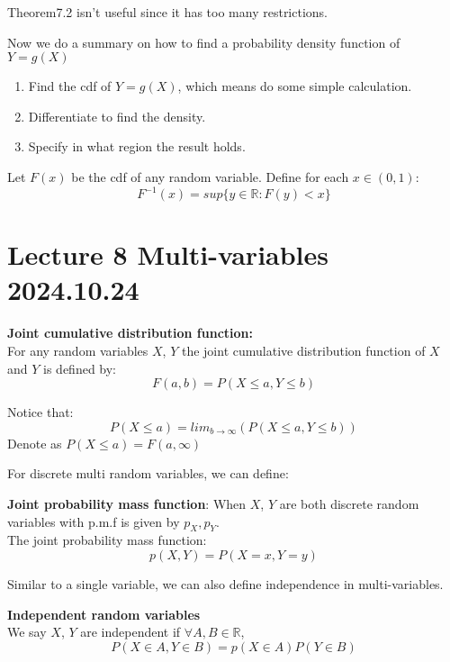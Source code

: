 \documentclass{article}
\begin{document}
Theorem7.2 isn't useful since it has too many restrictions.

Now we do a summary on how to find a probability density function of $Y = g(X)$
\begin{enumerate}
    \item Find the cdf of $Y = g(X)$, which means do some simple calculation.
    \item Differentiate to find the density.
    \item Specify in what region the result holds.
\end{enumerate}

\begin{theorem}
    Let $F(x)$ be the cdf of any random variable. Define for each $x \in (0,1)$:
    $$ F^{-1}(x) = sup\{y \in \mathbb{R}: F(y) < x\}$$
\end{theorem}






\section{Lecture 8 Multi-variables 2024.10.24}

\begin{definition}
    \textbf{Joint cumulative distribution function:}\\
    For any random variables $X$, $Y$ the joint cumulative distribution function of $X$ and $Y$ is defined by:
    $$ F(a, b) = P(X \leq a, Y \leq b)$$
\end{definition}
Notice that:
$$ P(X \leq a) = lim_{b \rightarrow \infty}(P(X \leq a, Y \leq b))$$
Denote as $P(X \leq a) = F(a, \infty)$

For discrete multi random variables, we can define:
\begin{definition}
    \textbf{Joint probability mass function}:
    When $X$, $Y$ are both discrete random variables with p.m.f is given by $p_X,p_Y$.\\
    The joint probability mass function:
    $$ p(X,Y) = P(X = x, Y = y)$$
\end{definition}

Similar to a single variable, we can also define independence in multi-variables.
\begin{definition}
    \textbf{Independent random variables}\\
    We say $X$, $Y$ are independent if $\forall A,B \in \mathbb{R}$, 
    $$ P(X \in A, Y \in B) = p(X \in A)P(Y \in B)$$
\end{definition}
\end{document}
